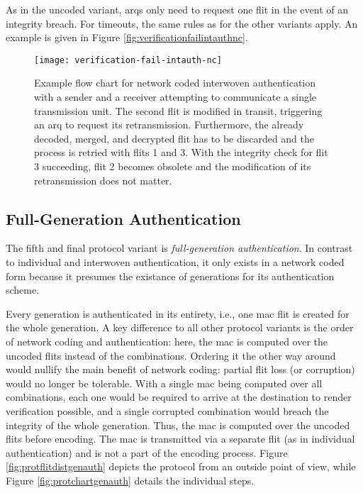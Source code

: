 As in the uncoded variant, \glspl{arq} only need to request one flit in the event of an integrity breach. For timeouts, the same rules as for the
other variants apply. An example is given in Figure \vref{fig:verificationfailintauthnc}.

\begin{figure}
    \centering
    \texttt{[image: verification-fail-intauth-nc]}
    \caption[Example flow chart for network coded int. auth. with integrity breach]{Example flow chart for network coded interwoven authentication
    with a sender and a receiver attempting to communicate a single transmission unit. The second flit is modified in transit, triggering an \gls{arq}
    to request its retransmission. Furthermore, the already decoded, merged, and decrypted flit has to be discarded and the process is retried with
    flits 1 and 3. With the integrity check for flit 3 succeeding, flit 2 becomes obsolete and the modification of its retransmission does not
    matter.}
    \label{fig:verificationfailintauthnc}
\end{figure}

\subsection{Full-Generation Authentication}\label{subsec:genauth}
The fifth and final protocol variant is \textit{full-generation authentication}. In contrast to individual and interwoven authentication, it only
exists in a network coded form because it presumes the existance of generations for its authentication scheme.

Every generation is authenticated in its entirety, i.e., one \gls{mac} flit is created for the whole generation. A key difference to all other
protocol variants is the order of network coding and authentication: here, the \gls{mac} is computed over the uncoded flits instead of the
combinations. Ordering it the other way around would nullify the main benefit of network coding: partial flit loss (or corruption) would no longer be
tolerable. With a single \gls{mac} being computed over all combinations, each one would be required to arrive at the destination to render verification
possible, and a single corrupted combination would breach the integrity of the whole generation. Thus, the \gls{mac} is computed over the uncoded
flits before encoding. The \gls{mac} is transmitted via a separate flit (as in individual authentication) and is not a part of the encoding process.
Figure \vref{fig:protflitdistgenauth} depicts the protocol from an outside point of view, while Figure \vref{fig:protchartgenauth} details the
individual steps.

